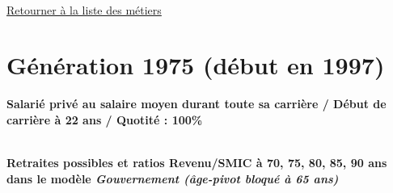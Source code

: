 

   
 \localtableofcontents 

~\\ 
 
 \hyperlink{page.2}{\noindent Retourner à la liste des métiers}

 \newpage 

\section{Génération 1975 (début en 1997)\label{SMPT_100_1975_22_0}} 
 
{\bf \noindent Salarié privé au salaire moyen durant toute sa carrière / Début de carrière à 22 ans / Quotité : 100\%}  ~ 

 ~\\{\bf \noindent Retraites possibles et ratios Revenu/SMIC à 70, 75, 80, 85, 90 ans dans le modèle \emph{Gouvernement (âge-pivot bloqué à 65 ans)}}  
 

